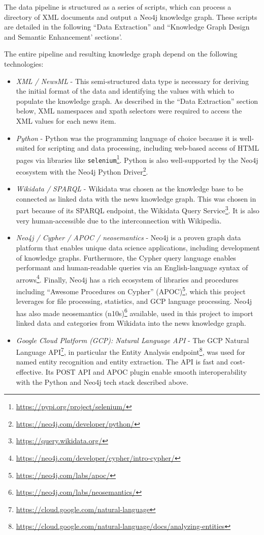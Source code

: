 \documentclass[11pt]{article}
\begin{document}
  The data pipeline is structured as a series of scripts, which can process a directory of XML documents and output a Neo4j knowledge graph. These scripts are detailed in the following ``Data Extraction'' and ``Knowledge Graph Design and Semantic Enhancement' sections'.

  The entire pipeline and resulting knowledge graph depend on the following technologies:

  \begin{itemize}
    \item{\textit{XML / NewsML}} - This semi-structured data type is necessary for deriving the initial format of the data and identifying the values with which to populate the knowledge graph. As described in the ``Data Extraction'' section below, XML namespaces and xpath selectors were required to access the XML values for each news item.
    \item{\textit{Python}} - Python was the programming language of choice because it is well-suited for scripting and data processing, including web-based access of HTML pages via libraries like \lstinline{selenium}\footnote{\url{https://pypi.org/project/selenium/}}. Python is also well-supported by the Neo4j ecosystem with the Neo4j Python Driver\footnote{\url{https://neo4j.com/developer/python/}}.
    \item{\textit{Wikidata / SPARQL}} - Wikidata was chosen as the knowledge base to be connected as linked data with the news knowledge graph. This was chosen in part because of its SPARQL endpoint, the Wikidata Query Service\footnote{\url{https://query.wikidata.org/}}. It is also very human-accessible due to the interconnection with Wikipedia.
    \item{\textit{Neo4j / Cypher / APOC / neosemantics}} - Neo4j is a proven graph data platform that enables unique data science applications, including development of knowledge graphs\cite{neo4j-kg-tutorial}. Furthermore, the Cypher query language enables performant and human-readable queries via an English-language syntax of arrows\footnote{\url{https://neo4j.com/developer/cypher/intro-cypher/}}. Finally, Neo4j has a rich ecosystem of libraries and procedures including ``Awesome Procedures on Cypher'' (APOC)\footnote{\url{https://neo4j.com/labs/apoc/}}, which this project leverages for file processing, statistics, and GCP language processing. Neo4j has also made neosemantics (n10s)\footnote{\url{https://neo4j.com/labs/neosemantics/}} available, used in this project to import linked data and categories from Wikidata into the news knowledge graph.
    \item{\textit{Google Cloud Platform (GCP): Natural Language API}} - The GCP Natural Language API\footnote{\url{https://cloud.google.com/natural-language}}, in particular the Entity Analysis endpoint\footnote{\url{https://cloud.google.com/natural-language/docs/analyzing-entities}}, was used for named entity recognition and entity extraction. The API is fast and cost-effective. Its POST API and APOC plugin enable smooth interoperability with the Python and Neo4j tech stack described above.
  \end{itemize}
\end{document}
